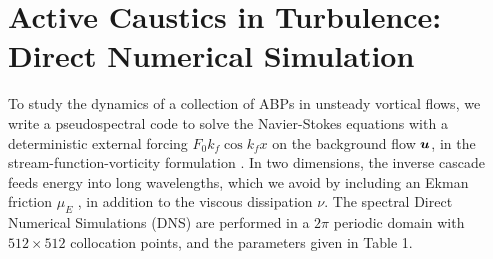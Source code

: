 \documentclass[../Rajarshi-thesis-draft.tex]{subfiles}
\begin{document}
\section{Active Caustics in Turbulence: Direct Numerical Simulation}
To study the dynamics of a collection of ABPs in unsteady vortical flows, we write a pseudospectral code to solve the Navier-Stokes equations with a deterministic external forcing $F_{0}k_f \cos{k_f x}$ on the background flow $\boldsymbol{u}$, in the stream-function-vorticity formulation \cite{gitproj}. In two dimensions, the inverse cascade feeds energy into long wavelengths, which we avoid by including an Ekman friction $\mu_E$ \cite{Boffetta2012}, in addition to the viscous dissipation $\nu$. The spectral Direct Numerical Simulations (DNS) are performed in a $2\pi$ periodic domain with $512 \times 512$ collocation points, and the parameters given in Table 1.
\end{document}
